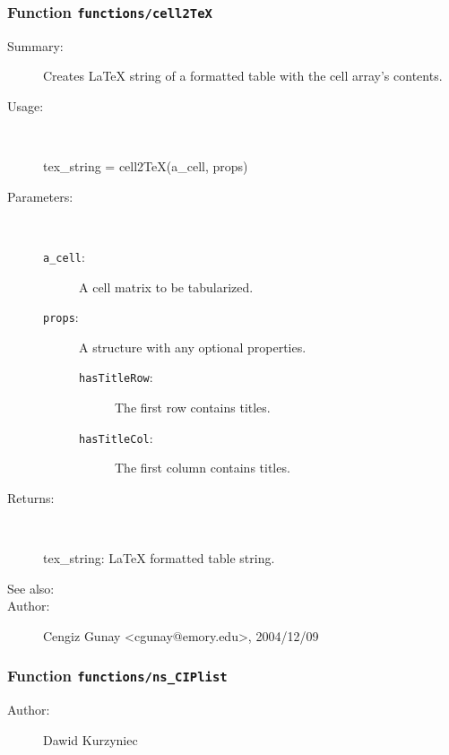 \subsubsection[Function \texttt{cell2TeX}]{Function \texttt{functions/cell2TeX}}%
%
\label{ref_functions__cell2TeX}%
\hypertarget{ref_functions__cell2TeX}{}%
\begin{description}
\item[Summary:]Creates LaTeX string of a formatted table with the cell array's contents.
%
\item[Usage:]~%
\begin{lyxcode}%
tex\_string = cell2TeX(a\_cell, props)
%
\end{lyxcode}%
%
%
\item[Parameters:]~
\begin{description}%
\item[\texttt{a\_cell}:]
 A cell matrix to be tabularized.
\item[\texttt{props}:]
 A structure with any optional properties.
\begin{description}%
\item[\texttt{hasTitleRow}:]
 The first row contains titles.
\item[\texttt{hasTitleCol}:]
 The first column contains titles.
\end{description}%
\end{description}%
%
\item[Returns:]~

	tex\_string: LaTeX formatted table string.
%
%
\item[See also:]%
%
\item[Author:]%
Cengiz Gunay <cgunay@emory.edu>, 2004/12/09%
\end{description}
\methodline%
\subsubsection[Function \texttt{ns\_CIPlist}]{Function \texttt{functions/ns\_CIPlist}}%
%
\label{ref_functions__ns_CIPlist}%
\hypertarget{ref_functions__ns_CIPlist}{}%
\begin{description}
%
%
%
%
%
%
%
\item[Author:]%
Dawid Kurzyniec%
\end{description}
\methodline%
